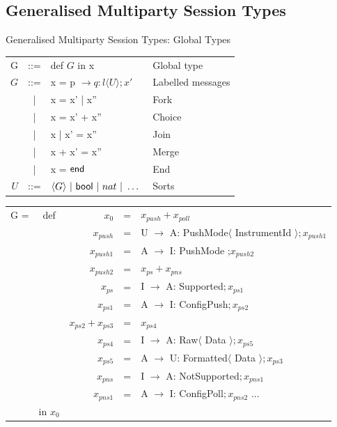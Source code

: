 \documentclass[8 pt]{beamer}
\newcommand{\kf}[1]{\textup{\textsf{#1}}\xspace}
\newcommand{\G}{\ensuremath{G}}
\newcommand{\UT}{\ensuremath{U}}
\newcommand{\End}{\kf{end}}
\newcommand{\Bool}{\kf{bool}}
\begin{document}
\subsection{Generalised Multiparty Session Types}
\begin{frame}{Generalised Multiparty Session Types: Global Types}
\begin{center}
\begin{tabular}{rcll}
G & ::= & def $\G$ in x & Global type \\
$\G$ & ::= & x  = p $\rightarrow q : l \langle \UT \rangle;x' $ & Labelled messages\\
& | & x = x' | x'' & Fork\\
& | & x = x' + x'' & Choice\\
& | & x | x' = x'' & Join\\
& | & x + x' = x'' & Merge\\
& | & x = $\End$ & End\\
\UT & ::= &$ \langle G\rangle\ |\ \Bool\ |\ nat \ |\ \ldots\ $ & Sorts\\
\end{tabular}
\end{center}
\begin{block}{}
\begin{tabular}{rcrcl}
G =&def& $x_{0}$ &=& $x_{push} + x_{poll}$\\
&& $x_{push}$ &=& U $\rightarrow$ A: PushMode$\langle$ InstrumentId $\rangle ; x_{push1}$\\
&& $x_{push1}$ &=& A $\rightarrow$ I: PushMode ;$ x_{push2}$\\
&& $x_{push2}$ &=& $ x_{ps} + x_{pns}$\\
&& $x_{ps}$ &=& I $\rightarrow$ A: Supported$ ; x_{ps1}$\\
&& $x_{ps1}$ &=& A $\rightarrow$ I: ConfigPush$ ; x_{ps2}$\\
&& $x_{ps2} + x_{ps3}$ &=& $x_{ps4}$\\
&& $x_{ps4}$ &=& I $\rightarrow$ A: Raw$\langle$ Data $\rangle ; x_{ps5}$\\
&& $x_{ps5}$ &=& A $\rightarrow$ U: Formatted$\langle$ Data $\rangle ; x_{ps3}$\\
&& $x_{pns}$ &=& I $\rightarrow$ A: NotSupported$ ; x_{pns1}$\\
&& $x_{pns1}$ &=& A $\rightarrow$ I: ConfigPoll$ ; x_{pns2}$ ...\\
&in $x_{0}$&&&\\
\end{tabular}
\end{block}
\end{frame}
\end{document}
